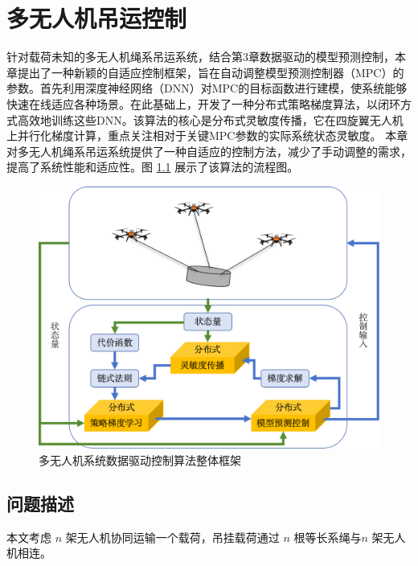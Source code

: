 \documentclass[lang=chs, degree=master, blindreview=true, winfonts=true]{yanputhesis}
\begin{document}
\cleardoublepage

\chapter{多无人机吊运控制}

针对载荷未知的多无人机绳系吊运系统，结合第3章数据驱动的模型预测控制，本章提出了一种新颖的自适应控制框架，旨在自动调整模型预测控制器（MPC）的参数。首先利用深度神经网络（DNN）对MPC的目标函数进行建模，使系统能够快速在线适应各种场景。在此基础上，开发了一种分布式策略梯度算法，以闭环方式高效地训练这些DNN。该算法的核心是分布式灵敏度传播，它在四旋翼无人机上并行化梯度计算，重点关注相对于关键MPC参数的实际系统状态灵敏度。
本章对多无人机绳系吊运系统提供了一种自适应的控制方法，减少了手动调整的需求，提高了系统性能和适应性。图 \ref{4_1} 展示了该算法的流程图。

\begin{figure}[hbt!]
	\centering
	\includegraphics[width=34pc]{picture/4_1.png} 
	\caption{多无人机系统数据驱动控制算法整体框架} 
	\label{4_1}
\end{figure}


\section{问题描述}
本文考虑 $n$ 架无人机协同运输一个载荷，吊挂载荷通过 $n$ 根等长系绳与$n$ 架无人机相连。
\end{document}

